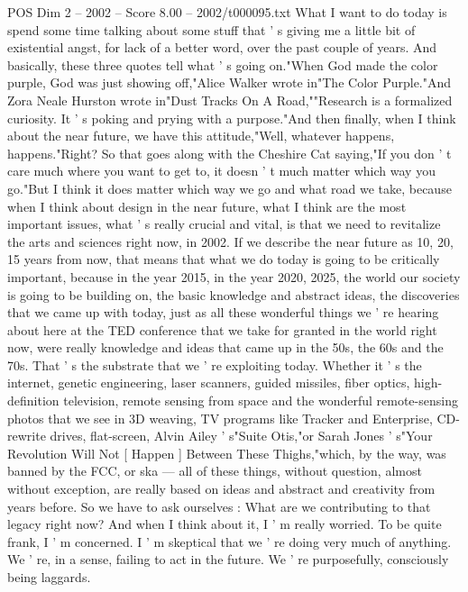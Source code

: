 \begin{textsample}{POS Dim 2 – 2002 – Score 8.00 – 2002/t000095.txt}  \label{ex:f2_pos_057}
What I want to do today is spend some time talking about some stuff that ' s giving me a little bit of existential angst, for lack of a better word, over the past couple of years.
And basically, these three quotes tell what ' s going on."When God made the color purple, God was just showing off,"Alice Walker wrote in"The Color Purple."And Zora Neale Hurston wrote in"Dust Tracks On A Road,""Research is a formalized curiosity.
It ' s poking and prying with a purpose."And then finally, when I think about the near future, we have this attitude,"Well, whatever happens, happens."Right?
So that goes along with the Cheshire Cat saying,"If you don ' t care much where you want to get to, it doesn ' t much matter which way you go."But I think it does matter which way we go and what road we take, because when I think about design in the near future, what I think are the most important issues, what ' s really crucial and vital, is that we need to revitalize the arts and sciences right now, in 2002.
If we describe the near future as 10, 20, 15 years from now, that means that what we do today is going to be critically important, because in the year 2015, in the year 2020, 2025, the world our society is going to be building on, the basic knowledge and abstract ideas, the discoveries that we came up with today, just as all these wonderful things we ' re hearing about here at the TED conference that we take for granted in the world right now, were really knowledge and ideas that came up in the 50s, the 60s and the 70s.
That ' s the substrate that we ' re exploiting today.
Whether it ' s the internet, genetic engineering, laser scanners, guided missiles, fiber optics, high-definition television, remote sensing from space and the wonderful remote-sensing photos that we see in 3D weaving, TV programs like Tracker and Enterprise, CD-rewrite drives, flat-screen, Alvin Ailey ' s"Suite Otis,"or Sarah Jones ' s"Your Revolution Will Not [ Happen ] Between These Thighs,"which, by the way, was banned by the FCC, or ska — all of these things, without question, almost without exception, are really based on ideas and abstract and creativity from years before.
So we have to ask ourselves : What are we contributing to that legacy right now?
And when I think about it, I ' m really worried.
To be quite frank, I ' m concerned.
I ' m skeptical that we ' re doing very much of anything.
We ' re, in a sense, failing to act in the future.
We ' re purposefully, consciously being laggards.

\end{textsample}
